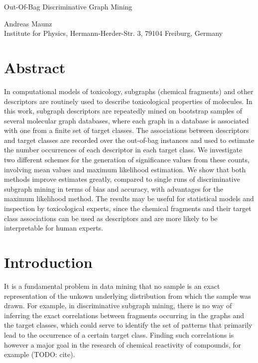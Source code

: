 \documentclass{article}
\begin{document}

\begin{center}
\begin{huge}Out-Of-Bag Discriminative Graph Mining\end{huge}

Andreas Maunz \\Institute for Physics, Hermann-Herder-Str. 3, 79104 Freiburg, Germany
\end{center}

\section{Abstract}
In computational models of toxicology, subgraphs (chemical fragments) and other
descriptors are routinely used to describe toxicological properties of
molecules.  In this work, subgraph descriptors are repeatedly mined on
bootstrap samples of several molecular graph databases, where each graph in a
database is associated with one from a finite set of target classes.  The
associations between descriptors and target classes are recorded over the
out-of-bag instances and used to estimate the number occurrences of each
descriptor in each target class.  We investigate two different schemes for the
generation of significance values from these counts, involving mean values and
maximum likelihood estimation.  We show that both methods improve estimates
greatly, compared to single runs of discriminative subgraph mining in terms of
bias and accuracy, with advantages for the maximum likelihood method.  The
results may be useful for statistical models and inspection by toxicological experts,
since the chemical fragments and their target class associations can be used as
descriptors and are more likely to be interpretable for human experts.

\section{Introduction}
It is a fundamental problem in data mining that no sample is an exact
representation of the unkown underlying distribution from which the sample was
drawn.  For example, in discriminative subgraph mining, there is no way of
inferring the exact correlations between fragments occurring in the graphs and
the target classes, which could serve to identify the set of patterns that primarily lead to the
occurrence of a certain target class. Finding such correlations is however a major goal
in the research of chemical reactivity of compounds, for example (TODO: cite).
\end{document}
